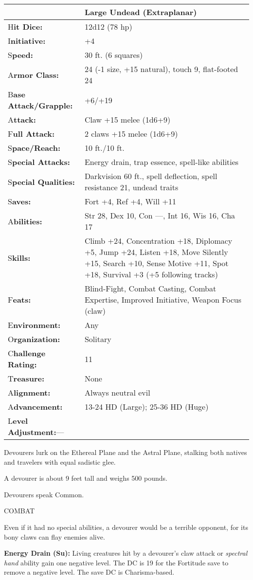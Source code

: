 \documentclass{article}
\begin{document}
\begin{tabular}{|>{\raggedright}p{86pt}|>{\raggedright}p{239pt}|}
\hline
  & Large Undead (Extraplanar)\tabularnewline
\hline
H\textbf{it Dice:} & 12d12 (78 hp)\tabularnewline
\hline
I\textbf{nitiative:} & +4\tabularnewline
\hline
S\textbf{peed:} & 30 ft. (6 squares)\tabularnewline
\hline
A\textbf{rmor Class:} & 24 (-1 size, +15 natural), touch 9, flat-footed 24\tabularnewline
\hline
B\textbf{ase Attack/Grapple:} & +6/+19\tabularnewline
\hline
A\textbf{ttack:} & Claw +15 melee (1d6+9)\tabularnewline
\hline
F\textbf{ull Attack:} & 2 claws +15 melee (1d6+9)\tabularnewline
\hline
S\textbf{pace/Reach:} & 10 ft./10 ft.\tabularnewline
\hline
S\textbf{pecial Attacks:} & Energy drain, trap essence, spell-like abilities\tabularnewline
\hline
S\textbf{pecial Qualities:} & Darkvision 60 ft., spell deflection, spell resistance 
21, undead traits\tabularnewline
\hline
S\textbf{aves:} & Fort +4, Ref +4, Will +11\tabularnewline
\hline
A\textbf{bilities:} & Str 28, Dex 10, Con ---, Int 16, Wis 16, Cha 17\tabularnewline
\hline
S\textbf{kills:} & Climb +24, Concentration +18, Diplomacy +5, Jump +24, Listen 
+18, Move Silently +15, Search +10, Sense Motive +11, Spot +18, Survival +3 (+5 
following tracks)\tabularnewline
\hline
F\textbf{eats:} & Blind-Fight, Combat Casting, Combat Expertise, Improved Initiative, 
Weapon Focus (claw)\tabularnewline
\hline
E\textbf{nvironment:} & Any\tabularnewline
\hline
O\textbf{rganization:} & Solitary\tabularnewline
\hline
C\textbf{hallenge Rating:} & 11\tabularnewline
\hline
T\textbf{reasure:} & None\tabularnewline
\hline
A\textbf{lignment:} & Always neutral evil\tabularnewline
\hline
A\textbf{dvancement:} & 13-24 HD (Large); 25-36 HD (Huge)\tabularnewline
\hline
L\textbf{evel Adjustment:}--- & \tabularnewline
\hline
\end{tabular}

Devourers lurk on the Ethereal Plane and the Astral Plane, stalking both natives 
and travelers with equal sadistic glee.

A devourer is about 9 feet tall and weighs 500 pounds.

Devourers speak Common.

COMBAT

Even if it had no special abilities, a devourer would be a terrible opponent, for 
its bony claws can flay enemies alive.

\textbf{Energy Drain (Su):} Living creatures hit by a devourer's claw attack or 
\textit{spectral hand }ability gain one negative level. The DC is 19 for the Fortitude 
save to remove a negative level. The save DC is Charisma-based.
\end{document}

